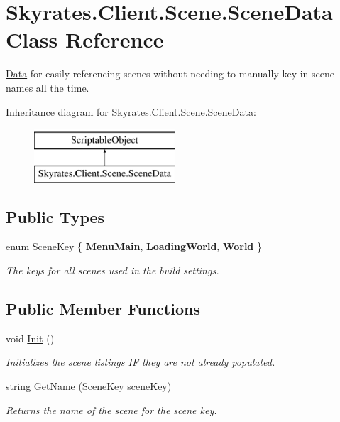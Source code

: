 \hypertarget{class_skyrates_1_1_client_1_1_scene_1_1_scene_data}{\section{Skyrates.\-Client.\-Scene.\-Scene\-Data Class Reference}
\label{class_skyrates_1_1_client_1_1_scene_1_1_scene_data}
}


\hyperlink{namespace_skyrates_1_1_client_1_1_data}{Data} for easily referencing scenes without needing to manually key in scene names all the time.  


Inheritance diagram for Skyrates.\-Client.\-Scene.\-Scene\-Data\-:\begin{figure}[H]
\begin{center}
\leavevmode
\includegraphics[height=2.000000cm]{class_skyrates_1_1_client_1_1_scene_1_1_scene_data}
\end{center}
\end{figure}
\subsection*{Public Types}
\begin{DoxyCompactItemize}
\item 
enum \hyperlink{class_skyrates_1_1_client_1_1_scene_1_1_scene_data_a31ee71a248fd3456a7e655f71f268583}{Scene\-Key} \{ {\bfseries Menu\-Main}, 
{\bfseries Loading\-World}, 
{\bfseries World}
 \}
\begin{DoxyCompactList}\small\item\em The keys for all scenes used in the build settings. \end{DoxyCompactList}\end{DoxyCompactItemize}
\subsection*{Public Member Functions}
\begin{DoxyCompactItemize}
\item 
void \hyperlink{class_skyrates_1_1_client_1_1_scene_1_1_scene_data_a00dcd79ce09e252eddcf4c7d63f00c1b}{Init} ()
\begin{DoxyCompactList}\small\item\em Initializes the scene listings I\-F they are not already populated. \end{DoxyCompactList}\item 
string \hyperlink{class_skyrates_1_1_client_1_1_scene_1_1_scene_data_ad89365f7fbe01c52f3d421dcaf9ee1e6}{Get\-Name} (\hyperlink{class_skyrates_1_1_client_1_1_scene_1_1_scene_data_a31ee71a248fd3456a7e655f71f268583}{Scene\-Key} scene\-Key)
\begin{DoxyCompactList}\small\item\em Returns the name of the scene for the scene key. \end{DoxyCompactList}\end{DoxyCompactItemize}
